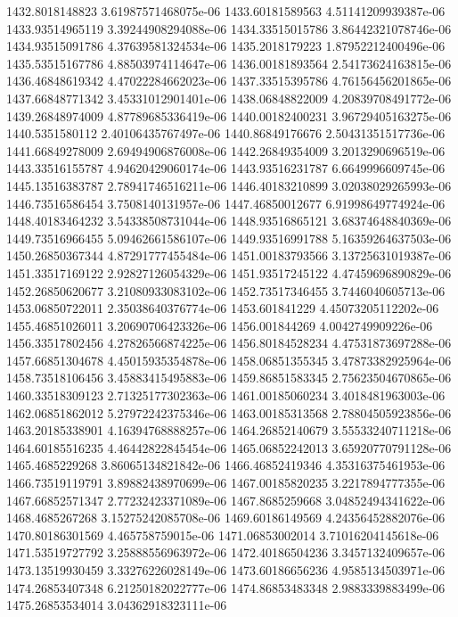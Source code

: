 {1432.8018148823 3.61987571468075e-06
1433.60181589563 4.51141209939387e-06
1433.93514965119 3.39244908294088e-06
1434.33515015786 3.86442321078746e-06
1434.93515091786 4.37639581324534e-06
1435.2018179223 1.87952212400496e-06
1435.53515167786 4.88503974114647e-06
1436.00181893564 2.54173624163815e-06
1436.46848619342 4.47022284662023e-06
1437.33515395786 4.76156456201865e-06
1437.66848771342 3.45331012901401e-06
1438.06848822009 4.20839708491772e-06
1439.26848974009 4.87789685336419e-06
1440.00182400231 3.96729405163275e-06
1440.5351580112 2.40106435767497e-06
1440.86849176676 2.50431351517736e-06
1441.66849278009 2.69494906876008e-06
1442.26849354009 3.2013290696519e-06
1443.33516155787 4.94620429060174e-06
1443.93516231787 6.6649996609745e-06
1445.13516383787 2.78941746516211e-06
1446.40183210899 3.02038029265993e-06
1446.73516586454 3.7508140131957e-06
1447.46850012677 6.91998649774924e-06
1448.40183464232 3.54338508731044e-06
1448.93516865121 3.68374648840369e-06
1449.73516966455 5.09462661586107e-06
1449.93516991788 5.16359264637503e-06
1450.26850367344 4.87291777455484e-06
1451.00183793566 3.13725631019387e-06
1451.33517169122 2.92827126054329e-06
1451.93517245122 4.47459696890829e-06
1452.26850620677 3.21080933083102e-06
1452.73517346455 3.7446040605713e-06
1453.06850722011 2.35038640376774e-06
1453.601841229 4.45073205112202e-06
1455.46851026011 3.20690706423326e-06
1456.001844269 4.0042749909226e-06
1456.33517802456 4.27826566874225e-06
1456.80184528234 4.47531873697288e-06
1457.66851304678 4.45015935354878e-06
1458.06851355345 3.47873382925964e-06
1458.73518106456 3.45883415495883e-06
1459.86851583345 2.75623504670865e-06
1460.33518309123 2.71325177302363e-06
1461.00185060234 3.4018481963003e-06
1462.06851862012 5.27972242375346e-06
1463.00185313568 2.78804505923856e-06
1463.20185338901 4.16394768888257e-06
1464.26852140679 3.55533240711218e-06
1464.60185516235 4.46442822845454e-06
1465.06852242013 3.65920770791128e-06
1465.4685229268 3.86065134821842e-06
1466.46852419346 4.35316375461953e-06
1466.73519119791 3.89882438970699e-06
1467.00185820235 3.2217894777355e-06
1467.66852571347 2.77232423371089e-06
1467.8685259668 3.04852494341622e-06
1468.4685267268 3.15275242085708e-06
1469.60186149569 4.24356452882076e-06
1470.80186301569 4.465758759015e-06
1471.06853002014 3.71016204145618e-06
1471.53519727792 3.25888556963972e-06
1472.40186504236 3.3457132409657e-06
1473.13519930459 3.33276226028149e-06
1473.60186656236 4.9585134503971e-06
1474.26853407348 6.21250182022777e-06
1474.86853483348 2.9883339883499e-06
1475.26853534014 3.04362918323111e-06
}
